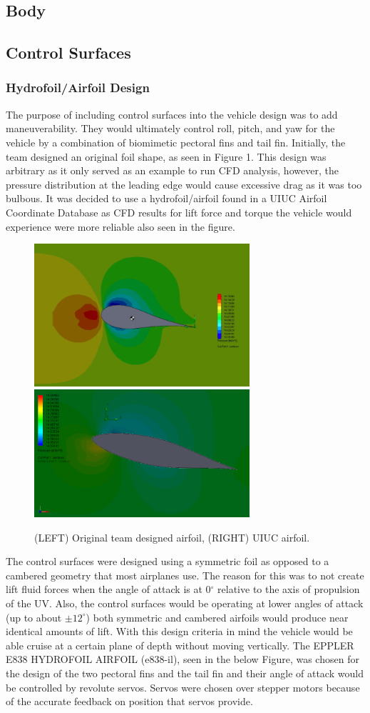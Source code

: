 \documentclass{report}
\begin{document}
\subsection{Body}
\subsection{Control Surfaces}
\subsubsection{Hydrofoil/Airfoil Design}
The purpose of including control surfaces into the vehicle design was to add maneuverability. They would ultimately control roll, pitch, and yaw for the vehicle by a combination of biomimetic pectoral fins and tail fin. Initially, the team designed an original foil shape, as seen in Figure 1. This design was arbitrary as it only served as an example to run CFD analysis, however, the pressure distribution at the leading edge would cause excessive drag as it was too bulbous.  It was decided to use a hydrofoil/airfoil found in a UIUC Airfoil Coordinate Database as CFD results for lift force and torque the vehicle would experience were more reliable also seen in the figure. 
\begin{figure}[H]
\centering
\includegraphics[width=8cm]{hfl}
\includegraphics[width=8cm]{hfr}
\caption{(LEFT) Original team designed airfoil, (RIGHT) UIUC airfoil.}
\end{figure}
The control surfaces were designed using a symmetric foil as opposed to a cambered geometry that most airplanes use. The reason for this was to not create lift fluid forces when the angle of attack is at 0$^\circ$ relative to the axis of propulsion of the UV.  Also, the control surfaces would be operating at lower angles of attack (up to about $\pm12^\circ$) both symmetric and cambered airfoils would produce near identical amounts of lift.  With this design criteria in mind the vehicle would be able cruise at a certain plane of depth without moving vertically. The EPPLER E838 HYDROFOIL AIRFOIL (e838-il), seen in the below Figure,  was chosen for the design of the two pectoral fins and the tail fin and their angle of attack would be controlled by revolute servos. Servos were chosen over stepper motors because of the accurate feedback on position that servos provide.
\end{document}
